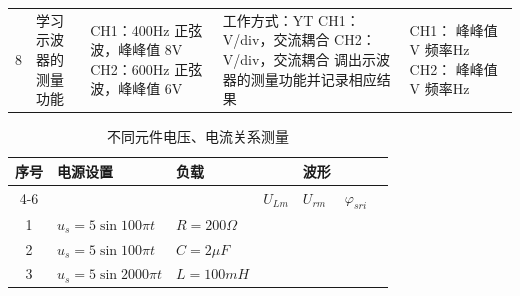 \documentclass[12pt,a4paper]{article}
\begin{document}
\begin{longtable}{|c|p{2cm}|p{2.5cm}|p{4.5cm}|p{4cm}|}
        8 & 学习示波器的测量功能 & CH1：400Hz 正弦波，峰峰值 8V \newline CH2：600Hz 正弦波，峰峰值 6V & 工作方式：YT \newline CH1：\uline{\phantom{\hspace{2cm}}}V/div，交流耦合 \newline CH2：\uline{\phantom{\hspace{2cm}}}V/div，交流耦合 \newline 调出示波器的测量功能并记录相应结果 & CH1： \newline 峰峰值\uline{\phantom{\hspace{2cm}}}V \newline 频率\uline{\phantom{\hspace{2cm}}}Hz \newline CH2： \newline 峰峰值\uline{\phantom{\hspace{2cm}}}V \newline 频率\uline{\phantom{\hspace{2cm}}}Hz \\
\end{longtable}

\vspace{1cm}

\renewcommand{\arraystretch}{2.0}

\begin{table}[htbp]
\centering
\caption{不同元件电压、电流关系测量}
\label{tab:7-2}
\begin{tabular}{|c|>{\centering\arraybackslash}p{3.2cm}|>{\centering\arraybackslash}p{2.5cm}|>{\centering\arraybackslash}p{1.7cm}|>{\centering\arraybackslash}p{1.7cm}|>{\centering\arraybackslash}p{1.7cm}|>{\centering\arraybackslash}p{2cm}|}
\hline
序号 & 电源设置 & 负载 & \multicolumn{3}{c|}{电压幅值} & 波形 \\
\cline{4-6}
 &  &  & $U_{Lm}$ & $U_{rm}$ & $\varphi_{sri}$ &  \\
\hline
1 & $u_s = 5\sin 100\pi t$ & $R=200\Omega$ & \rule{0pt}{3ex} & & & \\
\hline
2 & $u_s = 5\sin 100\pi t$ & $C=2\mu F$ & \rule{0pt}{3ex} & & & \\
\hline
3 & $u_s = 5\sin 2000\pi t$ & $L=100mH$ & \rule{0pt}{3ex} & & & \\
\hline
\end{tabular}
\end{table}
\end{document}
